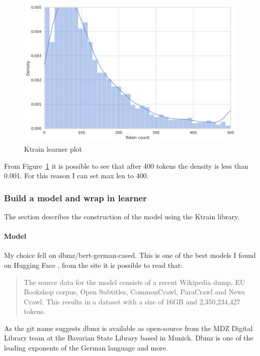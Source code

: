 \begin{figure}[ht!]
\centering
\includegraphics[width=1\textwidth]{images/512.png}
\caption{\gls{Ktrain} learner plot}
\label{fig:fig_07}
\end{figure}
\FloatBarrier

From Figure~\ref{fig:fig_07} it is possible to see that after 400 tokens the density is less than 0.001. For this reason I can set max len to 400.

\subsubsection{Build a model and wrap in learner}
\label{chap:ktrain build a model}
The section describes the construction of the model using the \gls{Ktrain} library.

\paragraph{Model}
My choice fell on dbmz/bert-german-cased.
This is one of the best models I found on \gls{Hugging Face} \cite{noauthor_dbmdzbert-base-german-uncased_nodate}, from the site it is possible to read that:
\begin{quote}
    The source data for the model consists of a recent Wikipedia dump, EU Bookshop corpus, Open Subtitles, CommonCrawl, ParaCrawl and News Crawl. This results in a dataset with a size of 16GB and 2,350,234,427 tokens.
\end{quote}

As the git name suggests dbmz \cite{noauthor_open_nodate} is available as open-source from the MDZ Digital Library team at the Bavarian State Library \cite{noauthor_munich_nodate} based in Munich. Dbmz is one of the leading exponents of the German language and more.


